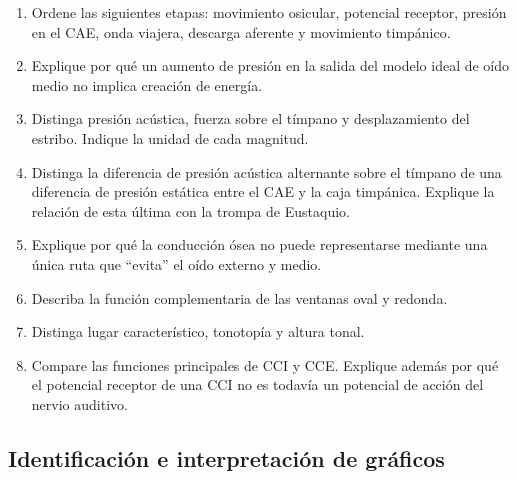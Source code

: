 \begin{enumerate}[label=\textbf{C\arabic*.},leftmargin=*]
    \item Ordene las siguientes etapas: movimiento osicular, potencial
    receptor, presión en el CAE, onda viajera, descarga aferente y movimiento
    timpánico.

    \item Explique por qué un aumento de presión en la salida del modelo ideal
    de oído medio no implica creación de energía.

    \item Distinga presión acústica, fuerza sobre el tímpano y desplazamiento
    del estribo. Indique la unidad de cada magnitud.

    \item Distinga la diferencia de presión acústica alternante sobre el
    tímpano de una diferencia de presión estática entre el CAE y la caja
    timpánica. Explique la relación de esta última con la trompa de Eustaquio.

    \item Explique por qué la conducción ósea no puede representarse mediante
    una única ruta que ``evita'' el oído externo y medio.

    \item Describa la función complementaria de las ventanas oval y redonda.

    \item Distinga lugar característico, tonotopía y altura tonal.

    \item Compare las funciones principales de CCI y CCE. Explique además por
    qué el potencial receptor de una CCI no es todavía un potencial de acción
    del nervio auditivo.
\end{enumerate}

\subsection*{Identificación e interpretación de gráficos}


